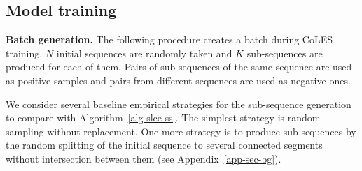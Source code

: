 \documentclass[sigconf]{acmart}
\begin{document}
\subsection{Model training} \label{sec-training}

\textbf{Batch generation.} The following procedure creates a batch during CoLES training. $N$ initial sequences are randomly taken and $K$ sub-sequences are produced for each of them. Pairs of sub-sequences of the same sequence are used as positive samples and pairs from different sequences are used as negative ones.

We consider several baseline empirical strategies for the sub-sequence generation to compare with Algorithm~\ref{alg-slce-ss}. The simplest strategy is random sampling without replacement.
One more strategy is to produce sub-sequences by the random splitting of the initial sequence to several connected segments without intersection between them
(see Appendix~\ref{app-sec-bg}). %




\end{document}
